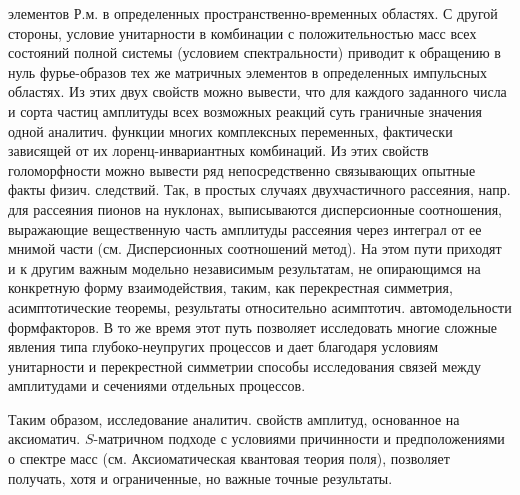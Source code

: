 \documentclass[10pt]{article}
\begin{document}
элементов Р.м. в определенных пространственно-временных областях. С другой стороны, условие унитарности в комбинации с положительностью масс всех состояний полной системы (условием спектральности) приводит к обращению в нуль фурье-образов тех же матричных элементов в определенных импульсных областях. Из этих двух свойств можно вывести, что для каждого заданного числа и сорта частиц амплитуды всех возможных реакций суть граничные значения одной аналитич. функции многих комплексных переменных, фактически зависящей от их лоренц-инвариантных комбинаций. Из этих свойств голоморфности можно вывести ряд непосредственно связывающих опытные факты физич. следствий. Так, в простых случаях двухчастичного рассеяния, напр. для рассеяния пионов на нуклонах, выписываются дисперсионные соотношения, выражающие вещественную часть амплитуды рассеяния через интеграл от ее мнимой части (см. Дисперсионных соотношений метод). На этом пути приходят и к другим важным модельно независимым результатам, не опирающимся на конкретную форму взаимодействия, таким, как перекрестная симметрия, асимптотические теоремы, результаты относительно асимптотич. автомодельности формфакторов. В то же время этот путь позволяет исследовать многие сложные явления типа глубоко-неупругих процессов и дает благодаря условиям унитарности и перекрестной симметрии способы исследования связей между амплитудами и сечениями отдельных процессов.



Таким образом, исследование аналитич. свойств амплитуд, основанное на аксиоматич. $S$-матричном подходе с условиями причинности и предположениями о спектре масс (см. Аксиоматическая квантовая теория поля), позволяет получать, хотя и ограниченные, но важные точные результаты.
\end{document}
